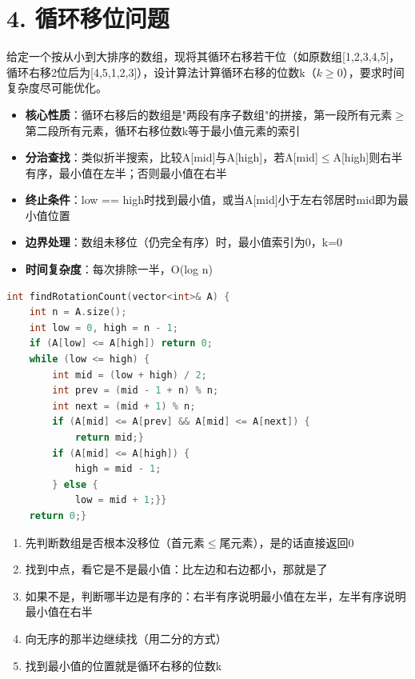 \section*{4. 循环移位问题}

给定一个按从小到大排序的数组，现将其循环右移若干位（如原数组[1,2,3,4,5]，循环右移2位后为[4,5,1,2,3]），设计算法计算循环右移的位数k（$k \ge 0$），要求时间复杂度尽可能优化。

\begin{itemize}
    \item \textbf{核心性质}：循环右移后的数组是"两段有序子数组"的拼接，第一段所有元素$\ge$第二段所有元素，循环右移位数k等于最小值元素的索引
    \item \textbf{分治查找}：类似折半搜索，比较A[mid]与A[high]，若A[mid]$\le$A[high]则右半有序，最小值在左半；否则最小值在右半
    \item \textbf{终止条件}：low == high时找到最小值，或当A[mid]小于左右邻居时mid即为最小值位置
    \item \textbf{边界处理}：数组未移位（仍完全有序）时，最小值索引为0，k=0
    \item \textbf{时间复杂度}：每次排除一半，O(log n)
\end{itemize}

\begin{lstlisting}[language=C++, style=cppstyle]
int findRotationCount(vector<int>& A) {
    int n = A.size();
    int low = 0, high = n - 1;
    if (A[low] <= A[high]) return 0;
    while (low <= high) {
        int mid = (low + high) / 2;
        int prev = (mid - 1 + n) % n;
        int next = (mid + 1) % n;
        if (A[mid] <= A[prev] && A[mid] <= A[next]) {
            return mid;}
        if (A[mid] <= A[high]) {
            high = mid - 1;
        } else {
            low = mid + 1;}}
    return 0;}
\end{lstlisting}

\begin{enumerate}
    \item 先判断数组是否根本没移位（首元素$\le$尾元素），是的话直接返回0
    \item 找到中点，看它是不是最小值：比左边和右边都小，那就是了
    \item 如果不是，判断哪半边是有序的：右半有序说明最小值在左半，左半有序说明最小值在右半
    \item 向无序的那半边继续找（用二分的方式）
    \item 找到最小值的位置就是循环右移的位数k
\end{enumerate}
